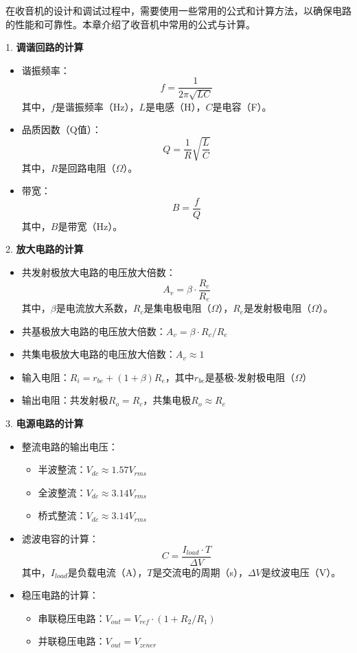 \documentclass[12pt,UTF8]{ctexbook}
\begin{document}
在收音机的设计和调试过程中，需要使用一些常用的公式和计算方法，以确保电路的性能和可靠性。本章介绍了收音机中常用的公式与计算。

1. \textbf{调谐回路的计算}
   \begin{itemize}[leftmargin=3.5em]
   \item 谐振频率：
     \[ f = \frac{1}{2\pi\sqrt{LC}} \]
     其中，$f$是谐振频率（Hz），$L$是电感（H），$C$是电容（F）。
   \item 品质因数（Q值）：
     \[ Q = \frac{1}{R}\sqrt{\frac{L}{C}} \]
     其中，$R$是回路电阻（$\Omega$）。
   \item 带宽：
     \[ B = \frac{f}{Q} \]
     其中，$B$是带宽（Hz）。
   \end{itemize}

2. \textbf{放大电路的计算}
   \begin{itemize}[leftmargin=3.5em]
   \item 共发射极放大电路的电压放大倍数：
     \[ A_v = \beta \cdot \frac{R_c}{R_e} \]
     其中，$\beta$是电流放大系数，$R_c$是集电极电阻（$\Omega$），$R_e$是发射极电阻（$\Omega$）。
   \item 共基极放大电路的电压放大倍数：$A_v = \beta \cdot R_c/R_e$
   \item 共集电极放大电路的电压放大倍数：$A_v \approx 1$
   \item 输入电阻：$R_i = r_{be} + (1+\beta)R_e$，其中$r_{be}$是基极-发射极电阻（$\Omega$）
   \item 输出电阻：共发射极$R_o = R_c$，共集电极$R_o \approx R_e$
   \end{itemize}

3. \textbf{电源电路的计算}
   \begin{itemize}[leftmargin=3.5em]
   \item 整流电路的输出电压：
     \begin{itemize}
       \item 半波整流：$V_{dc} \approx 1.57 V_{rms}$
       \item 全波整流：$V_{dc} \approx 3.14 V_{rms}$
       \item 桥式整流：$V_{dc} \approx 3.14 V_{rms}$
     \end{itemize}
   \item 滤波电容的计算：
     \[ C = \frac{I_{load} \cdot T}{\Delta V} \]
     其中，$I_{load}$是负载电流（A），$T$是交流电的周期（s），$\Delta V$是纹波电压（V）。
   \item 稳压电路的计算：
     \begin{itemize}
       \item 串联稳压电路：$V_{out} = V_{ref} \cdot (1 + R_2/R_1)$
       \item 并联稳压电路：$V_{out} = V_{zener}$
     \end{itemize}
   \end{itemize}
\end{document}
